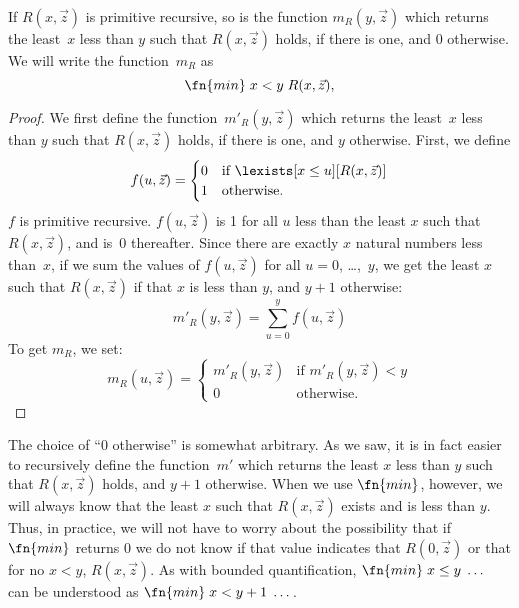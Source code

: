 \documentclass[../../include/open-logic-section]{subfiles}
\begin{document}


\begin{prop}
If $R(x, \vec z)$ is primitive recursive, so is the function $m_R(y,
\vec z)$ which returns the least~$x$ less than $y$ such that $R(x,\vec
z)$ holds, if there is one, and 0 otherwise.  We will write the
function~$m_R$ as
\[
\fn{min} \; x < y \; R(x, \vec z),
\]
\end{prop}

\begin{proof}
We first define the function~$m'_R(y, \vec z)$ which returns the
least~$x$ less than $y$ such that $R(x,\vec z)$ holds, if there is
one, and $y$ otherwise.  First, we define 
\[
f(u, \vec z) = 
\begin{cases}
0 & \text{if $\lexists[x \le u][R(x, \vec z)]$} \\
1 & \text{otherwise.}
\end{cases}
\]
$f$ is primitive recursive.  $f(u, \vec z)$ is 1 for all $u$ less than
the least $x$ such that $R(x, \vec z)$, and is~$0$ thereafter.  Since
there are exactly $x$ natural numbers less than~$x$, if we sum the
values of $f(u, \vec z)$ for all $u = 0$, \dots,~$y$, we get the least
$x$ such that $R(x, \vec z)$ if that $x$ is less than $y$, and $y+1$
otherwise:
\[
m'_R(y, \vec z) = \sum_{u = 0}^y f(u, \vec z)
\]
To get $m_R$, we set:
\[
m_R(u, \vec z) = 
\begin{cases}
m'_R(y, \vec z) & \text{if $m'_R(y, \vec z) < y$}\\
0 & \text{otherwise.}
\end{cases}
\]
\end{proof}

\begin{explain}
The choice of ``$0$ otherwise'' is somewhat arbitrary. As we saw, it
is in fact easier to recursively define the function~$m'$ which
returns the least $x$ less than $y$ such that $R(x,\vec z)$ holds, and
$y+1$ otherwise.  When we use $\fn{min}$, however, we will always know
that the least $x$ such that $R(x, \vec z)$ exists and is less than
$y$. Thus, in practice, we will not have to worry about the
possibility that if $\fn{min}$ returns $0$ we do not know if that
value indicates that $R(0, \vec z)$ or that for no $x < y$, $R(x, \vec
z)$. As with bounded quantification, $\fn{min} \; x \leq y \; \dots$
can be understood as $\fn{min} \; x < y + 1 \; \dots$.
\end{explain}
\end{document}
